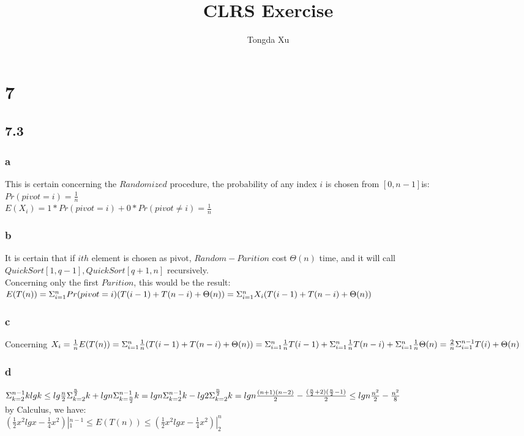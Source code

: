 \documentclass[]{article}
\title{CLRS Exercise}
\author{Tongda Xu}
\begin{document}
\maketitle
\section{7}
\subsection{7.3}
\subsubsection{a}
This is certain concerning the $Randomized$ procedure, the probability of any index $i$ is chosen from $[0,n-1]$is:\\
$Pr(pivot = i) = \frac{1}{n}$\\
$E(X_{i}) = 1*Pr(pivot = i) + 0*Pr(pivot \neq i) = \frac{1}{n}$

\subsubsection{b}
It is certain that if $ith$ element is chosen as pivot, $Random-Parition$ cost $\Theta(n)$ time, and it will call $QuickSort[1, q-1], QuickSort[q+1, n]$ recursively.\\
Concerning only the first $Parition$, this would be the result:\\
$E(T(n)) = \Sigma_{i=1}^{n}Pr(pivot = i)(T(i-1) + T(n-i) + \Theta(n))\\
 = \Sigma_{i=1}^{n}X_{i}(T(i-1) + T(n-i) + \Theta(n))$
 
\subsubsection{c}
Concerning $X_{i} = \frac{1}{n}\\
E(T(n)) = \Sigma_{i=1}^{n}\frac{1}{n}(T(i-1) + T(n-i) + \Theta(n))\\
= \Sigma_{i=1}^{n}\frac{1}{n}T(i-1) + \Sigma_{i=1}^{n}\frac{1}{n}T(n-i) + \Sigma_{i=1}^{n}\frac{1}{n}\Theta(n)\\
= \frac{2}{n}\Sigma_{i=1}^{n-1}T(i) + \Theta(n)$

\subsubsection{d}
$\Sigma_{k=2}^{n-1}klgk \\
\le lg\frac{n}{2}\Sigma_{k=2}^{\frac{n}{2}}k + lgn\Sigma_{k=\frac{n}{2}}^{n-1}k\\
= lgn\Sigma_{k=2}^{n-1}k - lg2\Sigma_{k=2}^{\frac{n}{2}}k\\
= lgn\frac{(n+1)(n-2)}{2} - \frac{(\frac{n}{2} + 2)(\frac{n}{2}-1)}{2}\\
\le lgn\frac{n^2}{2} - \frac{n^2}{8}$\\
by Calculus, we have:\\
$(\frac{1}{2}x^2lgx - \frac{1}{4}x^2)|_{1}^{n-1} \le E(T(n)) \le (\frac{1}{2}x^2lgx - \frac{1}{4}x^2)|_{2}^{n}$
\end{document}

